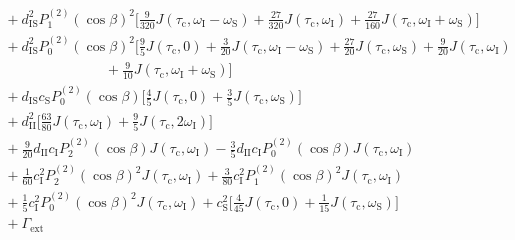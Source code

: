 \begin{appendixtext}
\begin{equation*}
\begin{split}
&\hspace{4pt}+d_{\text{IS}}^2P_1^{(2)}(\cos\beta)^2\bigg[\frac{9}{320}J\left(\tau_{\text{c}},\omega_{\text{I}}-\omega_{\text{S}}\right)+\frac{27}{320}J\left(\tau_{\text{c}},\omega_{\text{I}}\right)+\frac{27}{160}J\left(\tau_{\text{c}},\omega_{\text{I}}+\omega_{\text{S}}\right)\bigg] \\
&\hspace{4pt}+d_{\text{IS}}^2P_0^{(2)}(\cos\beta)^2\bigg[\frac{9}{5}J(\tau_{\text{c}},0)+\frac{3}{20}J\left(\tau_{\text{c}},\omega_{\text{I}}-\omega_{\text{S}}\right)+\frac{27}{20}J\left(\tau_{\text{c}},\omega_{\text{S}}\right)+\frac{9}{20}J\left(\tau_{\text{c}},\omega_{\text{I}}\right) \\ 
&\hspace{90pt}+\frac{9}{10}J\left(\tau_{\text{c}},\omega_{\text{I}}+\omega_{\text{S}}\right)\bigg] \\
&\hspace{4pt}+d_{\text{IS}}c_{\text{S}}P_0^{(2)}(\cos\beta)\bigg[\frac{4}{5}J\left(\tau_{\text{c}},0\right)+\frac{3}{5}J\left(\tau_{\text{c}},\omega_{\text{S}}\right)\bigg] \\
&\hspace{4pt}+d_{\text{II}}^2\bigg[\frac{63}{80}J\left(\tau_{\text{c}},\omega_{\text{I}}\right)+ \frac{9}{5}J\left(\tau_{\text{c}},2\omega_{\text{I}}\right)\bigg] \\
&\hspace{4pt}+ \frac{9}{20} d_{\text{II}}c_{\text{I}}P_2^{(2)}(\cos\beta) J\left(\tau_{\text{c}},\omega_{\text{I}}\right)- \frac{3}{5} d_{\text{II}}c_{\text{I}}P_0^{(2)}(\cos\beta) J\left(\tau_{\text{c}},\omega_{\text{I}}\right) \\ 
&\hspace{4pt}+\frac{1}{60} c_{\text{I}}^2P_2^{(2)}(\cos\beta)^2 J\left(\tau_{\text{c}},\omega_{\text{I}}\right)+\frac{3}{80} c_{\text{I}}^2P_1^{(2)}(\cos\beta)^2 J\left(\tau_{\text{c}},\omega_{\text{I}}\right) \\
&\hspace{4pt}+\frac{1}{5} c_{\text{I}}^2P_0^{(2)}(\cos\beta)^2J\left(\tau_{\text{c}},\omega_{\text{I}}\right)+c_{\text{S}}^2\bigg[\frac{4}{45}J\left(\tau_{\text{c}},0\right)+\frac{1}{15}J(\tau_{\text{c}},\omega_{\text{S}})\bigg] \\
&\hspace{4pt} +\Gamma_{\text{ext}}
\end{split}
\end{equation*}

\end{appendixtext}
